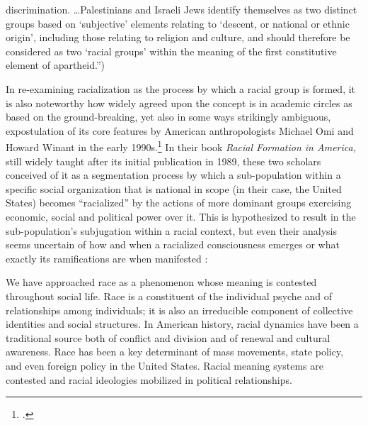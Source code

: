 \documentclass[../unravbook.tex]{subfiles}
\begin{document}
\begin{spacing}{1.2}
{discrimination. \ldots Palestinians and Israeli Jews identify themselves as two distinct groups based on \enquote*{subjective} elements relating to \enquote*{descent, or national or ethnic origin}, including those relating to religion and culture, and should therefore be considered as two \enquote*{racial groups} within the meaning of the first constitutive element of apartheid.'')} 

In re-examining racialization as the process by which a racial group is formed, it is also noteworthy how widely agreed upon the concept is in academic circles as based on the ground-breaking, yet also in some ways strikingly ambiguous, expostulation of its core features by American anthropologists Michael Omi and Howard Winant in the early 1990s.\footcite[][pp. 53-54. (\enquote{A second approach has been to focus on the common processes by which groups are formed (and reformed) as racial groups—that is, are identified by social and political institutions and self-identify as distinct races. This approach bypasses the problem of mapping racialized groups in a conceptual space or in a hierarchy of groups. Michael Omi and Howard Winant took this approach in their seminal work, Racial Formation in America, originally published in 1989 and reissued in revised versions in 1994 and 2014.})]{Glenn-2015} In their book \textit{Racial Formation in America,} still widely taught after its initial publication in 1989, these two scholars conceived of it as a segmentation process by which a sub-population within a specific social organization that is national in scope (in their case, the United States) becomes \enquote{racialized} by the actions of more dominant groups exercising economic, social and political power over it. This is hypothesized to result in the sub-population's subjugation within a racial context, but even their analysis seems uncertain of how and when a racialized consciousness emerges or what exactly its ramifications are when manifested \parencite[138]{Omi-Winant-1994}:

\begin{adjustwidth}{.65cm}{.5cm}
   \begin{singlespace}
   We have approached race as a phenomenon whose meaning is contested throughout social life. Race is a constituent of the individual psyche and of relationships among individuals; it is also an irreducible component of collective identities and social structures. In American history, racial dynamics have been a traditional source both of conflict and division and of renewal and cultural awareness. Race has been a key determinant of mass movements, state policy, and even foreign policy in the United States. Racial meaning systems are contested and racial ideologies mobilized in political relationships.
   \end{singlespace}
\end{adjustwidth}


\end{spacing}
\end{document}
